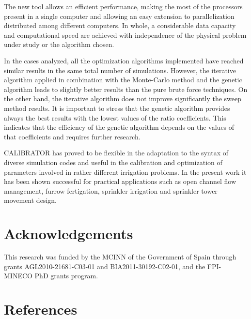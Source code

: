 \documentclass[review,authoryear]{elsarticle}
\begin{document}
The new tool allows an efficient performance, making the most of the processors present in a single computer and allowing an easy extension to parallelization distributed among different computers. In whole, a considerable data capacity and computational speed are achieved with independence of the physical problem under study or the algorithm chosen.

In the cases analyzed, all the optimization algorithms implemented have reached similar results in the same total number of simulations. However, the iterative algorithm applied in combination with the Monte-Carlo method and the genetic algorithm leads to slightly better results than the pure brute force techniques. On the other hand, the iterative algorithm does not improve significantly the sweep method results. It is important to stress that the genetic algorithm provides always the best results with the lowest values of the ratio coefficients. This indicates that the efficiency of the genetic algorithm depends on the values of that coefficients and requires further research. 

CALIBRATOR has proved to be flexible in the adaptation to the syntax of diverse simulation codes and useful in the calibration and optimization of parameters involved in rather different irrigation problems. In the present work it has been shown successful for practical applications such as open channel flow management, furrow fertigation, sprinkler irrigation and sprinkler tower movement design.

\section*{Acknowledgements}

This research was funded by the MCINN of the Government of Spain through grants AGL2010-21681-C03-01 and BIA2011-30192-C02-01, and the FPI-MINECO PhD grants program.

\section*{References}

\end{document}
